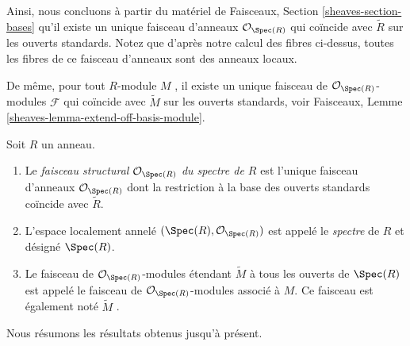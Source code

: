\medskip\noindent
Ainsi, nous concluons à partir du matériel de Faisceaux, Section  \ref{sheaves-section-bases} 
qu'il existe un unique faisceau d'anneaux  $\mathcal{O}_{\Spec(R)}$  qui coïncide avec
 $\widetilde R$  sur les ouverts standards. Notez que d'après notre calcul des fibres
ci-dessus, toutes les fibres de ce faisceau d'anneaux sont des anneaux locaux.

\medskip\noindent
De même, pour tout  $R$-module  $M$ , il existe un unique faisceau
de  $\mathcal{O}_{\Spec(R)}$-modules  $\mathcal{F}$  qui coïncide avec  $\widetilde M$  sur les
ouverts standards, voir Faisceaux, Lemme  \ref{sheaves-lemma-extend-off-basis-module}.

\begin{definition}
\label{definition-structure-sheaf}
Soit  $R$  un anneau.
\begin{enumerate}
\item Le  {\it faisceau structural $\mathcal{O}_{\Spec(R)}$ du spectre
de $R$} est l'unique faisceau d'anneaux $\mathcal{O}_{\Spec(R)}$ dont la restriction
à la base des ouverts standards coïncide avec $\widetilde R$.
\item L'espace localement annelé $(\Spec(R), \mathcal{O}_{\Spec(R)})$  est appelé le
 {\it spectre}  de  $R$  et désigné
 $\Spec(R)$.
\item Le faisceau de  $\mathcal{O}_{\Spec(R)}$-modules étendant  $\widetilde M$  à tous les ouverts de
 $\Spec(R)$  est appelé le faisceau de  $\mathcal{O}_{\Spec(R)}$-modules associé à
 $M$. Ce faisceau est également noté  $\widetilde M$ .
\end{enumerate}
\end{definition}

\noindent
Nous résumons les résultats obtenus jusqu'à présent.

